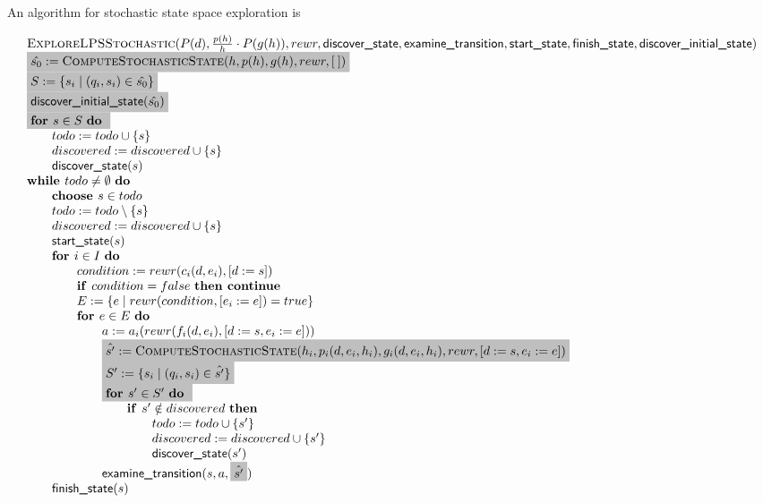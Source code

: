 \documentclass{article}
\newcommand{\emptylist}{\ensuremath{[\:]}}
\newcommand{\Space}{\text{\ }}
\newcommand{\If}{\text{\textbf{if }}}
\newcommand{\Do}{\text{\textbf{do }}}
\newcommand{\Then}{\text{\textbf{then }}}
\newcommand{\For}{\text{\textbf{for }}}
\newcommand{\While}{\text{\textbf{while }}}
\newcommand{\Continue}{\text{\textbf{continue }}}
\newcommand{\Choose}{\text{\textbf{choose }}}
\begin{document}
An algorithm for stochastic state space exploration is 

\[
\begin{tabular}{l}
\textsc{ExploreLPSStochastic}($P(d), \frac{p(h)}{h} \cdot P(g(h)), rewr, \textsf{discover\_state}, \textsf{examine\_transition},
\textsf{start\_state}, \textsf{finish\_state}, \textsf{discover\_initial\_state})$ \\
\colorbox{lightgray}{$\hat{s_0} := \textsc{ComputeStochasticState}(h, p(h), g(h), rewr, \emptylist)$} \\
\colorbox{lightgray}{$S := \{ s_i \mid (q_i, s_i) \in \hat{s_0} \}$} \\
\colorbox{lightgray}{$\textsf{discover\_initial\_state}(\hat{s_0})$} \\
\colorbox{lightgray}{$\For s \in S \Space \Do $}\\
\qquad $todo := todo \cup \{ s \}$ \\
\qquad $discovered := discovered \cup \{ s \} $ \\
\qquad $\textsf{discover\_state}(s)$ \\
$\While todo \neq \emptyset \Space \Do$ \\
\qquad \Choose $s \in todo$ \\
\qquad $todo := todo \setminus \{s\}$ \\
\qquad $discovered := discovered \cup \{s\}$ \\
\qquad $\textsf{start\_state}(s)$ \\
\qquad $\For i \in I  \Space \Do$ \\
\qquad \qquad $condition := rewr(c_i(d, e_i), [d := s])$ \\
\qquad \qquad $\If condition = false  \Space \Then \Continue$ \\
\qquad \qquad $E := \{ e \mid rewr(condition, [e_i := e]) = true \}$ \\
\qquad \qquad $\For e \in E  \Space \Do$ \\
\qquad \qquad \qquad $a := a_i(rewr(f_i(d,e_i), [d:=s,e_i:=e]))$ \\
\qquad \qquad \qquad \colorbox{lightgray}{$\hat{s'} := \textsc{ComputeStochasticState}(h_i, p_i(d,e_i,h_i), g_i(d,e_i,h_i), rewr, [d:=s, e_i:=e])$} \\
\qquad \qquad \qquad \colorbox{lightgray}{$S' := \{ s_i \mid (q_i, s_i) \in \hat{s'} \}$} \\
\qquad \qquad \qquad \colorbox{lightgray}{$\For s' \in S'$ \Do} \\
\qquad \qquad \qquad \qquad $\If s' \notin discovered \Space \Then$ \\
\qquad \qquad \qquad \qquad \qquad $todo := todo \cup \{ s' \}$ \\
\qquad \qquad \qquad \qquad \qquad $discovered := discovered \cup \{s'\}$ \\
\qquad \qquad \qquad \qquad \qquad $\textsf{discover\_state}(s')$ \\
\qquad \qquad \qquad $\textsf{examine\_transition}(s, a, \colorbox{lightgray}{$\hat{s'}$})$ \\
\qquad $\textsf{finish\_state}(s)$ \\
\end{tabular}
\]
\end{document}

